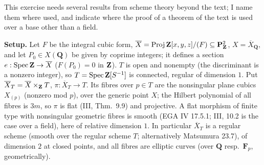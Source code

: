 \documentclass[11pt]{article}
\begin{document}
\pf
This exercise needs several results from scheme theory beyond the text; I name them where used, and indicate where the proof of a theorem of the text is used over a base other than a field.

\textbf{Setup.} Let $F$ be the integral cubic form, $\overline X=\operatorname{Proj}\mathbf Z[x,y,z]/(F)\subseteq\mathbf P^2_\mathbf Z$, $X=\overline X_{\mathbf Q}$, and let $P_0\in X(\mathbf Q)$ be given by coprime integers; it defines a section $e:\operatorname{Spec}\mathbf Z\to\overline X$ ($F(P_0)=0$ in $\mathbf Z$). $T$ is open and nonempty (the discriminant is a nonzero integer), so $T=\operatorname{Spec}\mathbf Z[S^{-1}]$ is connected, regular of dimension $1$. Put $\overline X_T=\overline X\times_{\mathbf Z}T$, $\pi:\overline X_T\to T$. Its fibres over $p\in T$ are the nonsingular plane cubics $X_{(p)}$ (nonzero mod $p$), over the generic point $X$; the Hilbert polynomial of all fibres is $3m$, so $\pi$ is flat (III, Thm.~9.9) and projective. A flat morphism of finite type with nonsingular geometric fibres is smooth (EGA IV 17.5.1; III, 10.2 is the case over a field), here of relative dimension $1$. In particular $\overline X_T$ is a regular scheme (smooth over the regular scheme $T$; alternatively Matsumura 23.7), of dimension $2$ at closed points, and all fibres are elliptic curves (over $\mathbf Q$ resp.\ $\mathbf F_p$, geometrically).
\end{document}
